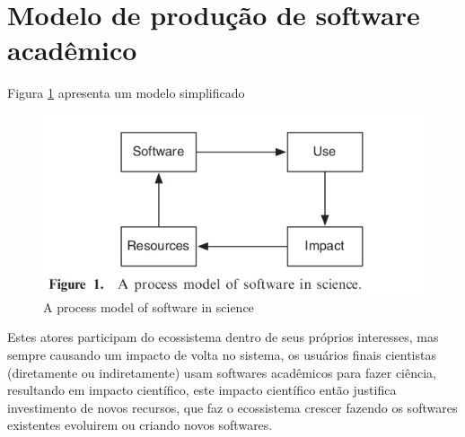 \section{Modelo de produção de software acadêmico}



Figura \ref{process-model-scientific-software} apresenta um modelo simplificado 

\begin{figure}[h]
  \center
  \includegraphics[scale=0.5]{imagens/process-model-scientific-software.png}
  \caption{A process model of software in science \cite{howison2015understanding}}
  \label{process-model-scientific-software}
\end{figure}


Estes atores participam do ecossistema dentro de seus próprios interesses, mas
sempre causando um impacto de volta no sistema, os usuários finais cientistas
(diretamente ou indiretamente) usam softwares acadêmicos para fazer ciência,
resultando em impacto científico, este impacto científico então justifica
investimento de novos recursos, que faz o ecossistema crescer fazendo os softwares
existentes evoluirem ou criando novos softwares.

%

